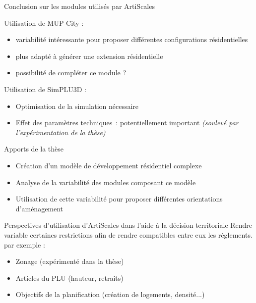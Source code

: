 \documentclass[xcolor=table]{beamer}
\begin{document}
\begin{frame}{Conclusion sur les modules utilisés par ArtiScales}
	\begin{block}{Utilisation de MUP-City :}
		\begin{itemize}
			\item variabilité intéressante pour proposer différentes configurations résidentielles
			\\
			\item plus adapté à générer une extension résidentielle
			\\
			\item possibilité de compléter ce module ? 			
		\end{itemize}
	\end{block}
	\begin{block}{Utilisation de SimPLU3D :}
		\begin{itemize}
			\item Optimisation de la simulation nécessaire
			\\
			\item Effet des paramètres techniques~: potentiellement important \textit{(soulevé par l'expérimentation de la thèse)}	\end{itemize}	
		\end{block}
\end{frame}
\begin{frame}{Apports de la thèse}
	\begin{itemize}
		\item Création d'un modèle de développement résidentiel complexe
		\item Analyse de la variabilité des modules composant ce modèle
		\item Utilisation de cette variabilité pour proposer différentes orientations d'aménagement
	\end{itemize}
\end{frame}

\begin{frame}{Perspectives d'utilisation d'ArtiScales dans l'aide à la décision territoriale}
	Rendre variable certaines restrictions afin de rendre compatibles entre eux les règlements.
	\\
	par exemple : 
	\begin{itemize}
		\item Zonage (expérimenté dans la thèse)
		\item Articles du PLU (hauteur, retraits)
		\item Objectifs de la planification (création de logements, densité...)
	\end{itemize}
\end{frame}
\end{document}

